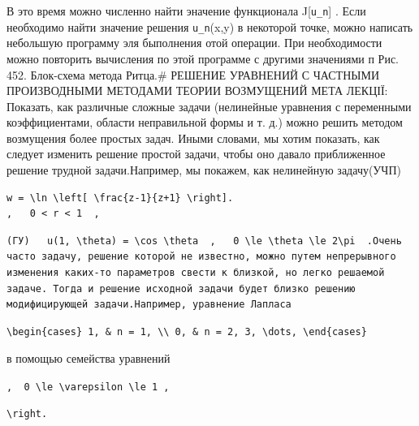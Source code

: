 \documentclass[
  ukrainian,
]{article}
\begin{document}
В это время можно численно найти эначение функционала
J{[}\texttt{u\_n}{]} . Если необходимо найти значение решения
\texttt{u\_n}(x,y) в некоторой точке, можно написать небольшую программу
эля быполнения отой операции. При необходимости можно повторить
вычисления по этой программе с другими значениями п Рис. 452. Блок-схема
метода Ритца.\# РЕШЕНИЕ УРАВНЕНИЙ С ЧАСТНЫМИ ПРОИЗВОДНЫМИ МЕТОДАМИ
ТЕОРИИ ВОЗМУЩЕНИЙ МЕТА ЛЕКЦІЇ: Показать, как различные сложные задачи
(нелинейные уравнения с переменными коэффициентами, области неправильной
формы и т. д.) можно решить методом возмущения более простых задач.
Иными словами, мы хотим показать, как следует изменить решение простой
задачи, чтобы оно давало приближенное решение трудной задачи.Например,
мы покажем, как нелинейную задачу(УЧП)

\begin{verbatim}
w = \ln \left[ \frac{z-1}{z+1} \right].
,   0 < r < 1  ,
\end{verbatim}

\begin{verbatim}
(ГУ)   u(1, \theta) = \cos \theta  ,   0 \le \theta \le 2\pi  .Очень часто задачу, решение которой не известно, можно путем непрерывного изменения каких-то параметров свести к близкой, но легко решаемой задаче. Тогда и решение исходной задачи будет близко решению модифицирующей задачи.Например, уравнение Лапласа
\end{verbatim}

\begin{verbatim}
\begin{cases} 1, & n = 1, \\ 0, & n = 2, 3, \dots, \end{cases}
\end{verbatim}

в помощью семейства уравнений

\texttt{,\ \ \textquotesingle{}0\ \textbackslash{}le\ \textbackslash{}varepsilon\ \textbackslash{}le\ 1\textquotesingle{}\ ,}

\begin{verbatim}
\right.
\end{verbatim}
\end{document}
